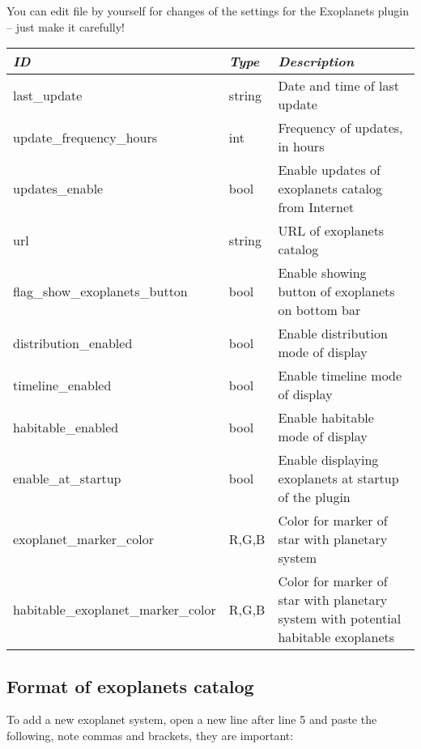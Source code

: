 You can edit  file by yourself for changes of the
settings for the Exoplanets plugin -- just make it carefully!

\begin{longtabu} to \textwidth {l|l|X}\toprule
\emph{ID}            & \emph{Type} & \emph{Description}\\\midrule
last\_update  & string & Date and time of last update \\\midrule
update\_frequency\_hours  & int & Frequency of updates, in hours \\\midrule
updates\_enable  & bool & Enable updates of exoplanets catalog from Internet \\\midrule
url  & string & URL of exoplanets catalog \\\midrule
flag\_show\_exoplanets\_button  & bool & Enable showing button of exoplanets on bottom bar \\\midrule
distribution\_enabled  & bool & Enable distribution mode of display \\\midrule
timeline\_enabled  & bool & Enable timeline mode of display \\\midrule
habitable\_enabled  & bool & Enable habitable mode of display \\\midrule
enable\_at\_startup  & bool & Enable displaying exoplanets at startup of the plugin \\\midrule
exoplanet\_marker\_color & R,G,B & Color for marker of star with planetary system \\\midrule
habitable\_exoplanet\_marker\_color  & R,G,B & Color for marker of star with planetary system with potential habitable exoplanets
 \\\bottomrule
\end{longtabu}

\subsection{Format of exoplanets catalog}
\label{sec:plugins:Exoplanets:format}

To add a new exoplanet system, open a new line after line 5 and paste the following, note commas and brackets, they are important:


